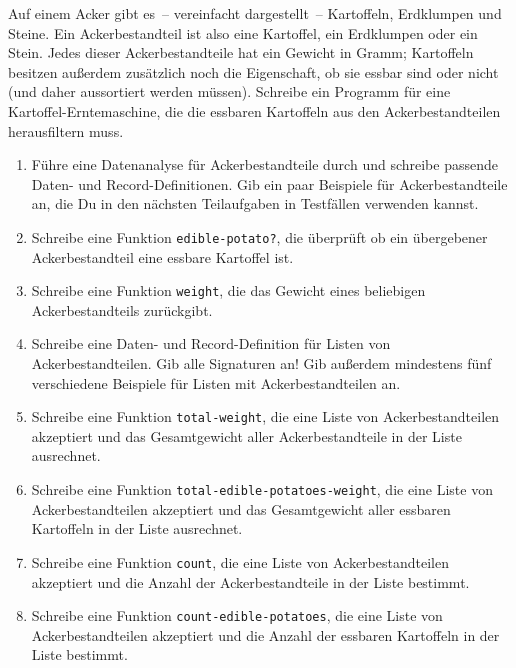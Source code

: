 \begin{aufgabe}
   Auf einem Acker gibt es~-- vereinfacht
  dargestellt~-- Kartoffeln, Erdklumpen und Steine.  Ein
  Ackerbestandteil ist also eine Kartoffel, ein Erdklumpen oder ein
  Stein.  Jedes dieser Ackerbestandteile hat ein Gewicht in Gramm;
  Kartoffeln besitzen außerdem zusätzlich noch die Eigenschaft, ob sie
  essbar sind oder nicht (und daher aussortiert werden müssen).
  Schreibe ein Programm für eine Kartoffel-Erntemaschine, die die
  essbaren Kartoffeln aus den Ackerbestandteilen herausfiltern muss.

  \begin{enumerate}
  \item Führe eine Datenanalyse für
    Ackerbestandteile durch und schreibe passende Daten- und
    Record-Definitionen.  Gib ein paar Beispiele für
    Ackerbestandteile an, die Du in den nächsten Teilaufgaben in
    Testfällen verwenden kannst.

  \item Schreibe eine Funktion
    \lstinline{edible-potato?}, die überprüft ob ein übergebener
    Ackerbestandteil eine essbare Kartoffel ist.

  \item Schreibe eine Funktion \lstinline{weight}, 
    die das Gewicht eines beliebigen Ackerbestandteils zurückgibt.

  \item Schreibe eine Daten- und Record-Definition
    für Listen von Ackerbestandteilen.  Gib alle Signaturen an!
    Gib außerdem mindestens fünf verschiedene Beispiele für Listen
    mit Ackerbestandteilen an.

  \item Schreibe eine Funktion \lstinline{total-weight},
    die eine Liste von Ackerbestandteilen akzeptiert und das Gesamtgewicht
    aller Ackerbestandteile in der Liste ausrechnet.

  \item Schreibe eine Funktion
    \lstinline{total-edible-potatoes-weight}, die eine Liste von Ackerbestandteilen
    akzeptiert und das Gesamtgewicht aller essbaren Kartoffeln in der Liste
    ausrechnet.

  \item Schreibe eine Funktion \lstinline{count}, die 
    eine Liste von Ackerbestandteilen akzeptiert und die Anzahl der
    Ackerbestandteile in der Liste bestimmt.

  \item Schreibe eine Funktion
    \lstinline{count-edible-potatoes}, die eine Liste von
    Ackerbestandteilen akzeptiert und die Anzahl der essbaren
    Kartoffeln in der Liste bestimmt.


\end{enumerate}
\end{aufgabe}

